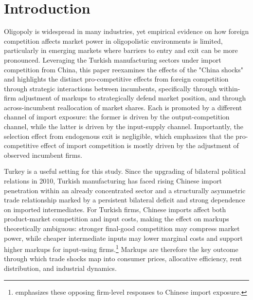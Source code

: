 \documentclass[12pt]{article}
\begin{document}
\section{Introduction}

Oligopoly is widespread in many industries, yet empirical evidence on how foreign competition affects market power in oligopolistic environments is limited, particularly in emerging markets where barriers to entry and exit can be more pronounced. Leveraging the Turkish manufacturing sectors under import competition from China, this paper reexamines the effects of the "China shocks" and highlights the distinct pro-competitive effects from foreign competition through strategic interactions between incumbents, specifically through within-firm adjustment of markups to strategically defend market position, and through across-incumbent reallocation of market shares. Each is promoted by a different channel of import exposure: the former is driven by the output-competition channel, while the latter is driven by the input-supply channel. Importantly, the selection effect from endogenous exit is negligible, which emphasizes that the pro-competitive effect of import competition is mostly driven by the adjustment of observed incumbent firms.

Turkey is a useful setting for this study. Since the upgrading of bilateral political relations in 2010, Turkish manufacturing has faced rising Chinese import penetration within an already concentrated sector and a structurally asymmetric trade relationship marked by a persistent bilateral deficit and strong dependence on imported intermediates. For Turkish firms, Chinese imports affect both product-market competition and input costs, making the effect on markups theoretically ambiguous: stronger final-good competition may compress market power, while cheaper intermediate inputs may lower marginal costs and support higher markups for input-using firms.\footnote{\textcite{aghionOpposingFirmLevelResponses2024} emphasizes these opposing firm-level responses to Chinese import exposure.} Markups are therefore the key outcome through which trade shocks map into consumer prices, allocative efficiency, rent distribution, and industrial dynamics.
\end{document}
